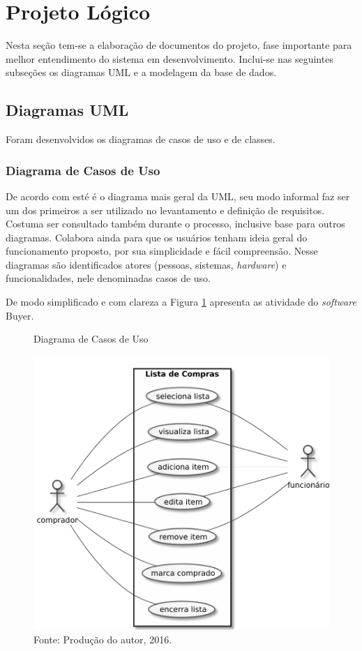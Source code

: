 \documentclass[
	12pt,
	openright,
	oneside, %
	a4paper,
	chapter=TITLE,
	section=TITLE,
	english,
	brazil %
	]{abntex2-udesc}
\begin{document}
\section{Projeto Lógico}

Nesta seção tem-se a elaboração de documentos do projeto, fase importante para melhor entendimento do sistema em desenvolvimento. Inclui-se nas seguintes subseções os diagramas UML e a modelagem da base de dados.

\subsection{Diagramas UML}

Foram desenvolvidos os diagramas de casos de uso e de classes.

\subsubsection{Diagrama de Casos de Uso}

De acordo com  esté é o diagrama mais geral da UML, seu modo informal faz ser um dos primeiros a ser utilizado no levantamento e definição de requisitos. Costuma ser consultado também durante o processo, inclusive base para outros diagramas. Colabora ainda para que os usuários tenham ideia geral do funcionamento proposto, por sua simplicidade e fácil compreensão. Nesse diagramas são identificados atores (pessoas, sistemas, \textit{hardware}) e funcionalidades, nele denominadas casos de uso.

De modo simplificado e com clareza a Figura \ref{fig:usecase} apresenta as atividade do \textit{software} Buyer.

\begin{figure}[h]
\caption{Diagrama de Casos de Uso}\label{fig:usecase}
\centering
\includegraphics{figures/usecase.pdf}
\caption*{\footnotesize Fonte: Produção do autor, 2016.}
\end{figure}
\end{document}
